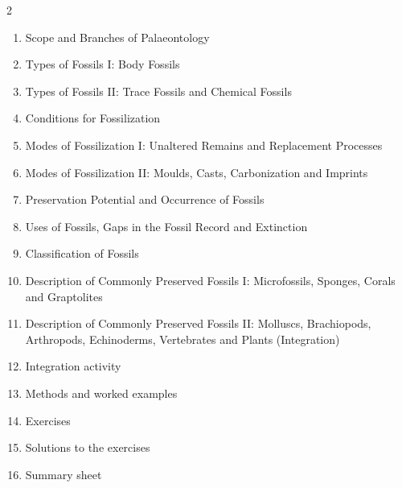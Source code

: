 \documentclass[11pt]{article}
\begin{document}
\begin{sommaire}
\begin{multicols}{2}
\begin{enumerate}
\item Scope and Branches of Palaeontology
\item Types of Fossils I: Body Fossils
\item Types of Fossils II: Trace Fossils and Chemical Fossils
\item Conditions for Fossilization
\item Modes of Fossilization I: Unaltered Remains and Replacement Processes
\item Modes of Fossilization II: Moulds, Casts, Carbonization and Imprints
\item Preservation Potential and Occurrence of Fossils
\item Uses of Fossils, Gaps in the Fossil Record and Extinction
\item Classification of Fossils
\item Description of Commonly Preserved Fossils I: Microfossils, Sponges, Corals and Graptolites
\item Description of Commonly Preserved Fossils II: Molluscs, Brachiopods, Arthropods, Echinoderms, Vertebrates and Plants (Integration)
\item Integration activity
\item Methods and worked examples
\item Exercises
\item Solutions to the exercises
\item Summary sheet
\end{enumerate}
\end{multicols}
\end{sommaire}
\end{document}
